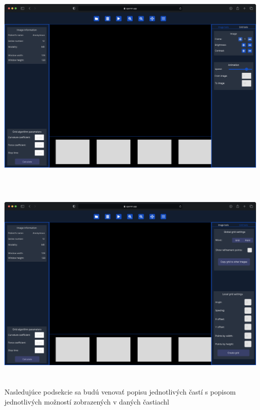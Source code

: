 \begin {center}
\centering
\includegraphics[height=10cm]{media/wireframes/1.png}
\captionsetup{justification=centering}
\end {center}

\begin {center}
\centering
\includegraphics[height=10cm]{media/wireframes/2.png}
\captionsetup{justification=centering}
\end {center}

Nasledujúce podsekcie sa budú venovať popisu jednotlivých častí s popisom jednotlivých možností zobrazených v daných častiachl

